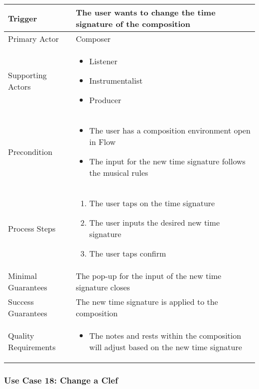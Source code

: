 \begin{tabularx}{\textwidth}{|X|X|}
\hline
Trigger & 
The user wants to change the time signature of the composition \\
\hline
Primary Actor & 
Composer \\
\hline
Supporting Actors & 
\begin{itemize}
\item Listener
\item Instrumentalist
\item Producer
\end{itemize} \\
\hline
Precondition & 
\begin{itemize}
\item The user has a composition environment open in Flow
\item The input for the new time signature follows the musical rules
\end{itemize} \\
\hline
Process Steps & 
\begin{enumerate}
\item The user taps on the time signature
\item The user inputs the desired new time signature
\item The user taps confirm
\end{enumerate} \\
\hline
Minimal Guarantees & 
The pop-up for the input of the new time signature closes \\
\hline
Success Guarantees & 
The new time signature is applied to the composition \\
\hline
Quality Requirements & 
\begin{itemize}
\item The notes and rests within the composition will adjust based on the new time signature
\end{itemize} \\ 
\hline
\end{tabularx}

\subsubsection{Use Case 18: Change a Clef}


